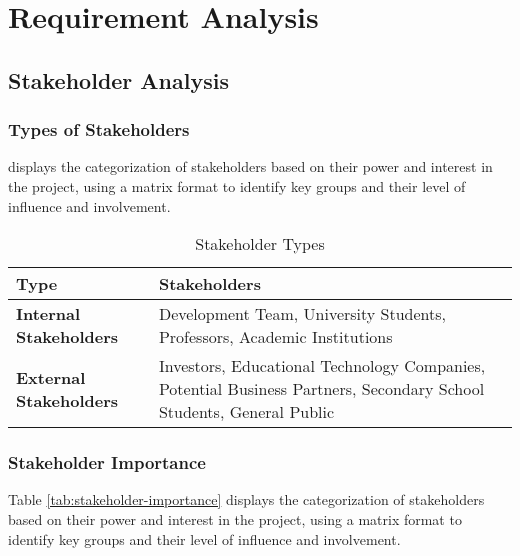 \chapter{Requirement Analysis}
\label{chap:requirement-analysis}

\section{Stakeholder Analysis}
\label{section:stakeholder-analysis}
% 

\subsection{Types of Stakeholders}
displays the categorization of stakeholders based on their power and interest in the project, using a matrix format to identify key groups and their level of influence and involvement.
\begin{table}[H]
    \centering
    \begin{tabularx}{\linewidth}{|l|X|}
        \rowcolor{gray!70}
        \hline
        \textbf{Type} & \textbf{Stakeholders} \\ 
        \hline
        \textbf{Internal Stakeholders} & Development Team, University Students, Professors, Academic Institutions \\ 
        \hline
        \textbf{External Stakeholders} & Investors, Educational Technology Companies, Potential Business Partners, Secondary School Students, General Public \\ 
        \hline
    \end{tabularx}
    \caption{Stakeholder Types}
    \label{tab:stakeholder-types}
\end{table}
\newpage
\subsection{Stakeholder Importance}
Table \ref{tab:stakeholder-importance} displays the categorization of stakeholders based on their power and interest in the project, using a matrix format to identify key groups and their level of influence and involvement.

